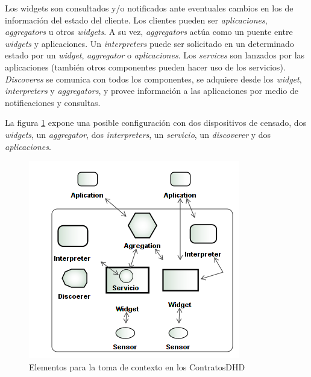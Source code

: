 Los widgets son consultados y/o notificados ante eventuales cambios en los
de información del estado del cliente. Los clientes pueden ser \textit{aplicaciones}, \textit{aggregators} u
otros \textit{widgets}. A su vez, \textit{aggregators} actúa como un puente entre \textit{widgets} y aplicaciones. Un \textit{interpreters} puede ser solicitado en un determinado estado por un \textit{widget}, \textit{aggregator} o \textit{aplicaciones}. Los \textit{services} son lanzados por las aplicaciones (también otros componentes pueden hacer uso de los servicios). \textit{Discoveres} se comunica con todos los componentes, se adquiere desde los \textit{widget}, \textit{interpreters} y \textit{aggregators}, y provee información a las aplicaciones por medio de notificaciones y consultas.

La figura \ref{fig:toolkit} expone una posible configuración con dos
dispositivos de censado, dos \textit{widgets}, un \textit{aggregator}, dos
\textit{interpreters}, un \textit{servicio}, un \textit{discoverer} y dos
\textit{aplicaciones}.



\begin{figure}
\begin{center}
 \includegraphics [width=5 in,totalheight=2 in]{Ch4/ContextToolsKit.png}
\caption{Elementos para la toma de contexto en los ContratosDHD}
\label{fig:toolkit}
\end{center}
\end{figure}


